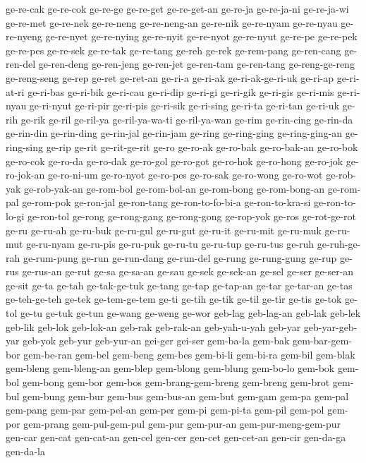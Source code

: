 {ge-re-cak ge-re-cok ge-re-ge ge-re-get ge-re-get-an ge-re-ja ge-re-ja-ni
ge-re-ja-wi ge-re-met ge-re-nek ge-re-neng ge-re-neng-an ge-re-nik
ge-re-nyam ge-re-nyau ge-re-nyeng ge-re-nyet ge-re-nying ge-re-nyit
ge-re-nyot ge-re-nyut ge-re-pe ge-re-pek ge-re-pes ge-re-sek ge-re-tak
ge-re-tang ge-reh ge-rek ge-rem-pang ge-ren-cang ge-ren-del ge-ren-deng
ge-ren-jeng ge-ren-jet ge-ren-tam ge-ren-tang ge-reng-ge-reng ge-reng-seng
ge-rep ge-ret ge-ret-an ge-ri-a ge-ri-ak ge-ri-ak-ge-ri-uk ge-ri-ap
ge-ri-at-ri ge-ri-bas ge-ri-bik ge-ri-cau ge-ri-dip ge-ri-gi ge-ri-gik
ge-ri-gis ge-ri-mis ge-ri-nyau ge-ri-nyut ge-ri-pir ge-ri-pis ge-ri-sik
ge-ri-sing ge-ri-ta ge-ri-tan ge-ri-uk ge-rih ge-rik ge-ril ge-ril-ya
ge-ril-ya-wa-ti ge-ril-ya-wan ge-rim ge-rin-cing ge-rin-da ge-rin-din
ge-rin-ding ge-rin-jal ge-rin-jam ge-ring ge-ring-ging ge-ring-ging-an
ge-ring-sing ge-rip ge-rit ge-rit-ge-rit ge-ro ge-ro-ak ge-ro-bak
ge-ro-bak-an ge-ro-bok ge-ro-cok ge-ro-da ge-ro-dak ge-ro-gol ge-ro-got
ge-ro-hok ge-ro-hong ge-ro-jok ge-ro-jok-an ge-ro-ni-um ge-ro-nyot
ge-ro-pes ge-ro-sak ge-ro-wong ge-ro-wot ge-rob-yak ge-rob-yak-an
ge-rom-bol ge-rom-bol-an ge-rom-bong ge-rom-bong-an ge-rom-pal ge-rom-pok
ge-ron-jal ge-ron-tang ge-ron-to-fo-bi-a ge-ron-to-kra-si ge-ron-to-lo-gi
ge-ron-tol ge-rong ge-rong-gang ge-rong-gong ge-rop-yok ge-ros
ge-rot-ge-rot ge-ru ge-ru-ah ge-ru-buk ge-ru-gul ge-ru-gut ge-ru-it
ge-ru-mit ge-ru-muk ge-ru-mut ge-ru-nyam ge-ru-pis ge-ru-puk ge-ru-tu
ge-ru-tup ge-ru-tus ge-ruh ge-ruh-ge-rah ge-rum-pung ge-run ge-run-dang
ge-run-del ge-rung ge-rung-gung ge-rup ge-rus ge-rus-an ge-rut ge-sa
ge-sa-an ge-sau ge-sek ge-sek-an ge-sel ge-ser ge-ser-an ge-sit ge-ta
ge-tah ge-tak-ge-tuk ge-tang ge-tap ge-tap-an ge-tar ge-tar-an ge-tas
ge-teh-ge-teh ge-tek ge-tem-ge-tem ge-ti ge-tih ge-tik ge-til ge-tir
ge-tis ge-tok ge-tol ge-tu ge-tuk ge-tun ge-wang ge-weng ge-wor geb-lag
geb-lag-an geb-lak geb-lek geb-lik geb-lok geb-lok-an geb-rak geb-rak-an
geb-yah-u-yah geb-yar geb-yar-geb-yar geb-yok geb-yur geb-yur-an gei-ger
gei-ser gem-ba-la gem-bak gem-bar-gem-bor gem-be-ran gem-bel gem-beng
gem-bes gem-bi-li gem-bi-ra gem-bil gem-blak gem-bleng gem-bleng-an
gem-blep gem-blong gem-blung gem-bo-lo gem-bok gem-bol gem-bong gem-bor
gem-bos gem-brang-gem-breng gem-breng gem-brot gem-bul gem-bung gem-bur
gem-bus gem-bus-an gem-but gem-gam gem-pa gem-pal gem-pang gem-par
gem-pel-an gem-per gem-pi gem-pi-ta gem-pil gem-pol gem-por gem-prang
gem-pul-gem-pul gem-pur gem-pur-an gem-pur-meng-gem-pur gen-car gen-cat
gen-cat-an gen-cel gen-cer gen-cet gen-cet-an gen-cir gen-da-ga gen-da-la
}
